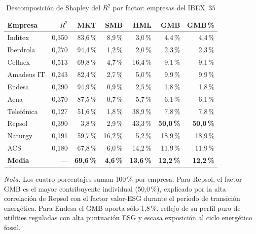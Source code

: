 \documentclass[12pt, a4paper]{article}
\begin{document}
\begin{table}[H]
  \centering
  \caption{Descomposici\'on de Shapley del $R^2$ por factor: empresas del IBEX~35}
  \label{tab:shapley}
  \small
  \begin{tabular}{lrrrrrr}
    \toprule
    Empresa & $R^2$ & MKT & SMB & HML & GMB & GMB\,\% \\
    \midrule
    Inditex     & 0{,}350 & 83{,}6\,\% & 8{,}9\,\% & 3{,}0\,\% & 4{,}4\,\%  &  4{,}4\,\% \\
    Iberdrola   & 0{,}270 & 94{,}4\,\% & 1{,}2\,\% & 2{,}0\,\% & 2{,}3\,\%  &  2{,}3\,\% \\
    Cellnex     & 0{,}513 & 69{,}8\,\% & 4{,}7\,\% & 16{,}4\,\% & 9{,}1\,\% &  9{,}1\,\% \\
    Amadeus IT  & 0{,}243 & 82{,}4\,\% & 2{,}7\,\% & 5{,}0\,\%  & 9{,}9\,\% &  9{,}9\,\% \\
    Endesa      & 0{,}290 & 94{,}9\,\% & 0{,}9\,\% & 2{,}5\,\%  & 1{,}8\,\% &  1{,}8\,\% \\
    Aena        & 0{,}370 & 87{,}5\,\% & 0{,}7\,\% & 5{,}7\,\%  & 6{,}1\,\% &  6{,}1\,\% \\
    Telef\'onica & 0{,}127 & 51{,}6\,\% & 1{,}8\,\% & 38{,}9\,\% & 7{,}8\,\% &  7{,}8\,\% \\
    Repsol      & 0{,}390 & 3{,}8\,\%  & 2{,}9\,\% & 43{,}3\,\% & \textbf{50{,}0\,\%} & \textbf{50{,}0\,\%} \\
    Naturgy     & 0{,}191 & 59{,}7\,\% & 16{,}2\,\% & 5{,}2\,\% & 18{,}9\,\% & 18{,}9\,\% \\
    ACS         & 0{,}180 & 67{,}8\,\% & 6{,}0\,\% & 14{,}2\,\% & 11{,}9\,\% & 11{,}9\,\% \\
    \midrule
    \textbf{Media} & --- & \textbf{69{,}6\,\%} & \textbf{4{,}6\,\%} & \textbf{13{,}6\,\%} & \textbf{12{,}2\,\%} & \textbf{12{,}2\,\%} \\
    \bottomrule
  \end{tabular}
  \begin{minipage}{\linewidth}
    \small\vspace{0.3em}
    \textit{Nota:} Los cuatro porcentajes suman 100\,\% por empresa.
    Para Repsol, el factor GMB es el mayor contribuyente individual (50{,}0\,\%),
    explicado por la alta correlaci\'on de Repsol con el factor valor-ESG durante
    el per\'iodo de transici\'on energ\'etica. Para Endesa el GMB aporta s\'olo
    1{,}8\,\%, reflejo de su perfil puro de utilities reguladas con alta puntuaci\'on
    ESG y escasa exposici\'on al ciclo energ\'etico fossil.
  \end{minipage}
\end{table}
\end{document}
